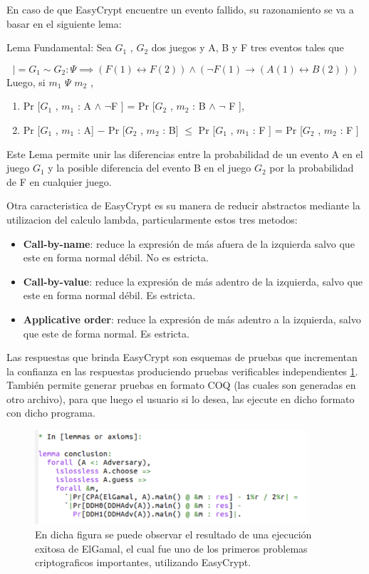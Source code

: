 \documentclass[runningheads,a4paper]{llncs}
\begin{document}
En caso de que EasyCrypt encuentre un evento fallido, su razonamiento se va a basar en el siguiente lema:
\begin{lemma}{Lema Fundamental:}
Sea $G_1$ , $G_2$ dos juegos y A, B y F tres eventos tales que

\[|= G_1 ∼ G_2 : \Psi \implies (F(1) \leftrightarrow F(2)) \land (\neg F(1) \rightarrow (A(1) \leftrightarrow B(2)))\]
Luego, si $m_1$ $\Psi$ $m_2$ ,
\begin{enumerate}
	\item Pr [$G_1$ , $m_1$ : A $\land$ $\neg$F ] = Pr [$G_2$ , $m_2$ : B $\land$ $\neg$ F ],
	\item Pr [$G_1$ , $m_1$ : A] − Pr [$G_2$ , $m_2$ : B] $\leq$  Pr [$G_1$ , $m_1$ : F ] = Pr [$G_2$ , $m_2$ : F ]
\end{enumerate}
\end{lemma}

Este Lema permite unir las diferencias entre la probabilidad de un evento A en el juego $G_1$ y la posible diferencia del evento B en el juego $G_2$ por la probabilidad de F en cualquier juego.\cite{article4}


Otra caracteristica de EasyCrypt es su manera de reducir abstractos mediante la utilizacion del calculo lambda, particularmente estos tres metodos:

\begin{itemize}

	\item \textbf{Call-by-name}: reduce la expresión de más afuera de la izquierda salvo que este en forma normal débil. No es estricta.

	\item \textbf{Call-by-value}: reduce la expresión de más adentro de la izquierda, salvo que este en forma normal débil. Es estricta.

	\item \textbf{Applicative order}: reduce la expresión de más adentro a la izquierda, salvo que este de forma normal. Es estricta.
\end{itemize}

Las respuestas que brinda EasyCrypt son esquemas de pruebas que incrementan la confianza en las respuestas produciendo pruebas verificables independientes \ref{fig1}. También permite generar pruebas en formato COQ (las cuales son generadas en otro archivo), para que luego el usuario si lo desea, las ejecute en dicho formato con dicho programa.\cite{article4}

\begin{figure}
\includegraphics[width=\textwidth, height=3.5cm]{fig1.png}
\caption{En dicha figura se puede observar el resultado de una ejecución exitosa de ElGamal, el cual fue uno de los primeros problemas criptograficos importantes, utilizando EasyCrypt.} \label{fig1}
\end{figure}
\end{document}
